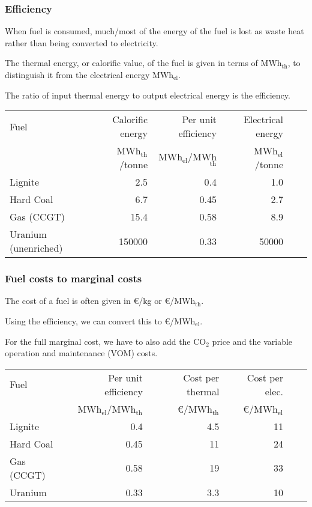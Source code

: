 \documentclass[10pt,aspectratio=169,dvipsnames]{beamer}
\newcommand{\ra}[1]{\renewcommand{\arraystretch}{#1}}
\begin{document}
\begin{frame}
  \frametitle{Efficiency}

  When fuel is consumed, much/most of the energy of the fuel is lost
  as waste heat rather than being converted to electricity.

  The thermal energy, or calorific value, of the fuel is given in
  terms of MWh${}_{\textrm{th}}$, to distinguish it from the
  electrical energy MWh${}_{\textrm{el}}$.

  The ratio of input thermal energy to output electrical energy is the
  \alert{efficiency}.

  \ra{1.1}
  \begin{table}[!t]
    \begin{tabular}{lrrrrr}
      \toprule
      Fuel & Calorific energy & Per unit efficiency & Electrical energy \\
       & MWh\(_{\text{th}}\)/tonne & MWh\(_{\text{el}}\)/MWh\(_{\text{th}}\) & MWh\(_{\text{el}}\)/tonne \\
\midrule
Lignite & 2.5 & 0.4 & 1.0 \\
Hard Coal & 6.7 & 0.45 & 2.7\\
Gas (CCGT) & 15.4 & 0.58 & 8.9\\
Uranium (unenriched) & 150000 & 0.33 & 50000 \\
      \bottomrule
    \end{tabular}
  \end{table}




\end{frame}


\begin{frame}
  \frametitle{Fuel costs to marginal costs}


  The cost of a fuel is often given in \euro/kg or \euro/MWh\(_{\text{th}}\).

  Using the efficiency, we can convert this to
  \euro/MWh\(_{\text{el}}\).

  For the full marginal cost, we have to
  also add the CO$_2$ price and the variable operation and maintenance
  (VOM) costs.


  \ra{1.1}
  \begin{table}[!t]
    \begin{tabular}{lrrrrr}
      \toprule
      Fuel &  Per unit efficiency & Cost per thermal & Cost per elec. \\
      &  MWh\(_{\text{el}}\)/MWh\(_{\text{th}}\)  & \euro/MWh\(_{\text{th}}\) & \euro/MWh\(_{\text{el}}\)\\
\midrule
Lignite  & 0.4  & 4.5 & 11\\
Hard Coal  & 0.45   & 11 & 24\\
Gas (CCGT) & 0.58  & 19 & 33\\
Uranium & 0.33 & 3.3 & 10\\
      \bottomrule
    \end{tabular}
  \end{table}



\end{frame}
\end{document}
